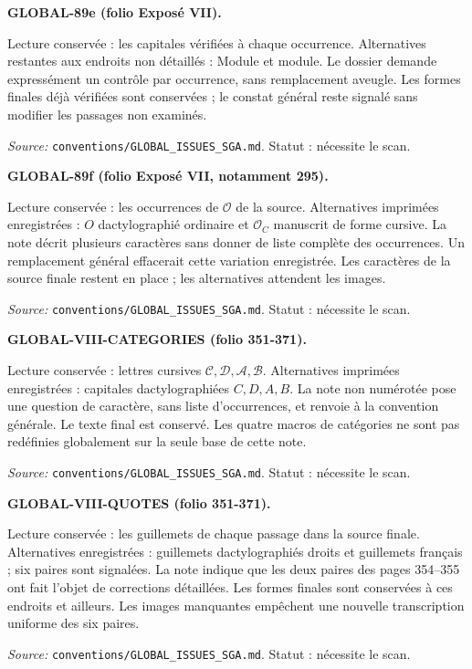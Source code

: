 \medskip\noindent\textbf{GLOBAL-89e (folio Exposé VII).}\par
Lecture conservée : les capitales vérifiées à chaque occurrence. Alternatives restantes aux endroits non détaillés : Module et module.
Le dossier demande expressément un contrôle par occurrence, sans remplacement aveugle. Les formes finales déjà vérifiées sont conservées ; le constat général reste signalé sans modifier les passages non examinés.
\par\noindent\textit{Source: }\texttt{conventions/GLOBAL\_ISSUES\_SGA.md}. Statut : nécessite le scan.

\medskip\noindent\textbf{GLOBAL-89f (folio Exposé VII, notamment 295).}\par
Lecture conservée : les occurrences de $\mathcal{O}$ de la source. Alternatives imprimées enregistrées : $O$ dactylographié ordinaire et $\mathcal{O}_C$ manuscrit de forme cursive.
La note décrit plusieurs caractères sans donner de liste complète des occurrences. Un remplacement général effacerait cette variation enregistrée. Les caractères de la source finale restent en place ; les alternatives attendent les images.
\par\noindent\textit{Source: }\texttt{conventions/GLOBAL\_ISSUES\_SGA.md}. Statut : nécessite le scan.

\medskip\noindent\textbf{GLOBAL-VIII-CATEGORIES (folio 351-371).}\par
Lecture conservée : lettres cursives $\mathcal{C},\mathcal{D},\mathcal{A},\mathcal{B}$. Alternatives imprimées enregistrées : capitales dactylographiées $C,D,A,B$.
La note non numérotée pose une question de caractère, sans liste d’occurrences, et renvoie à la convention générale. Le texte final est conservé. Les quatre macros de catégories ne sont pas redéfinies globalement sur la seule base de cette note.
\par\noindent\textit{Source: }\texttt{conventions/GLOBAL\_ISSUES\_SGA.md}. Statut : nécessite le scan.

\medskip\noindent\textbf{GLOBAL-VIII-QUOTES (folio 351-371).}\par
Lecture conservée : les guillemets de chaque passage dans la source finale. Alternatives enregistrées : guillemets dactylographiés droits et guillemets français ; six paires sont signalées.
La note indique que les deux paires des pages 354--355 ont fait l’objet de corrections détaillées. Les formes finales sont conservées à ces endroits et ailleurs. Les images manquantes empêchent une nouvelle transcription uniforme des six paires.
\par\noindent\textit{Source: }\texttt{conventions/GLOBAL\_ISSUES\_SGA.md}. Statut : nécessite le scan.

